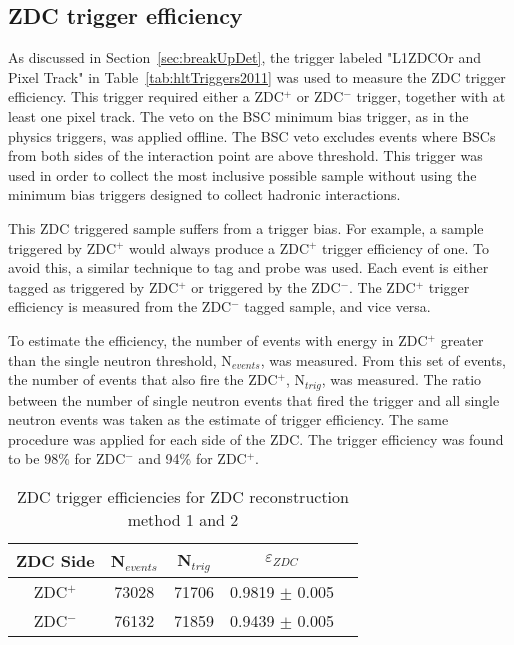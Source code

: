     \subsection{ZDC trigger efficiency}
      As discussed in Section~\ref{sec:breakUpDet}, the trigger labeled 
        "L1ZDCOr and Pixel Track" in Table~\ref{tab:hltTriggers2011} was used 
        to measure the ZDC trigger efficiency. 
      This trigger required either a ZDC$^{+}$ or ZDC$^{-}$ trigger, together with at 
        least one pixel track. 
      The veto on the BSC minimum bias trigger, as in the physics triggers, was
        applied offline.
      The BSC veto excludes events where BSCs from both sides of the 
        interaction point are above threshold. 
      This trigger was used in order to collect the most inclusive possible 
        sample without using the minimum bias triggers designed to collect 
        hadronic interactions.

      This ZDC triggered sample suffers from a trigger bias. 
      For example, a sample triggered by ZDC$^{+}$ would always produce a 
        ZDC$^{+}$ trigger efficiency of one. 
      To avoid this, a similar technique to tag and probe was used.
      Each event is either tagged as triggered by ZDC$^{+}$ or triggered 
        by the ZDC$^{-}$. 
      The ZDC$^{+}$ trigger efficiency is measured from the ZDC$^{-}$ tagged 
        sample, and vice versa.

      To estimate the efficiency, the number of events with energy in 
        ZDC$^{+}$ greater than the single neutron threshold, N$_{events}$, 
        was measured.
      From this set of events, the number of events that also fire the 
        ZDC$^{+}$, N$_{trig}$, was measured.
      The ratio between the number of single neutron events that fired the 
        trigger and all single neutron events was taken as the estimate of 
        trigger efficiency. 
      The same procedure was applied for each side of the ZDC.
      The trigger efficiency was found to be 98\% for ZDC$^{-}$
        and 94\% for ZDC$^{+}$.

      \begin{table}
        \centering
        \begin{tabular}{|c|c|c|c|c|}
           \hline ZDC Side & N$_{events}$ & N$_{trig}$ & $\varepsilon_{ZDC}$ \\ \hline
           ZDC$^{+}$ & 73028  & 71706  & 0.9819  $\pm$ 0.005  \\ \hline
           ZDC$^{-}$ & 76132  & 71859  & 0.9439  $\pm$ 0.005  \\ \hline
        \end{tabular}
        \caption{ZDC trigger efficiencies for ZDC reconstruction method 1 and 
          2}
        \label{tab:zdcEfficiency}
      \end{table}

